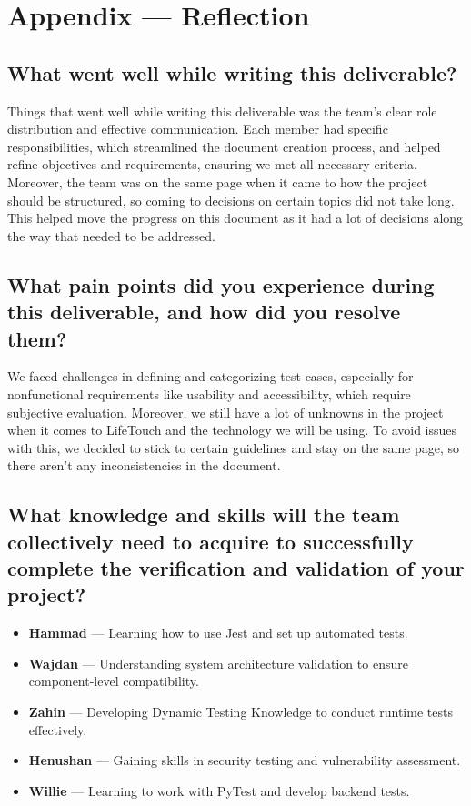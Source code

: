 \documentclass[12pt, titlepage]{article}
\begin{document}
\newpage{}




\newpage{}


\appendix
\section*{Appendix — Reflection}

\subsection*{What went well while writing this deliverable?}

Things that went well while writing this deliverable was the team’s clear role distribution and effective communication. Each member had specific responsibilities, which streamlined the document creation process, and helped refine objectives and requirements, ensuring we met all necessary criteria. Moreover, the team was on the same page when it came to how the project should be structured, so coming to decisions on certain topics did not take long. This helped move the progress on this document as it had a lot of decisions along the way that needed to be addressed.

\subsection*{What pain points did you experience during this deliverable, and how did you resolve them?}

We faced challenges in defining and categorizing test cases, especially for nonfunctional requirements like usability and accessibility, which require subjective evaluation. Moreover, we still have a lot of unknowns in the project when it comes to LifeTouch and the technology we will be using. To avoid issues with this, we decided to stick to certain guidelines and stay on the same page, so there aren't any inconsistencies in the document.

\subsection*{What knowledge and skills will the team collectively need to acquire to successfully complete the verification and validation of your project?}

\begin{itemize}
    \item \textbf{Hammad} — Learning how to use Jest and set up automated tests.
    \item \textbf{Wajdan} — Understanding system architecture validation to ensure component-level compatibility.
    \item \textbf{Zahin} — Developing Dynamic Testing Knowledge to conduct runtime tests effectively.
    \item \textbf{Henushan} — Gaining skills in security testing and vulnerability assessment.
    \item \textbf{Willie} — Learning to work with PyTest and develop backend tests.
\end{itemize}
\end{document}
